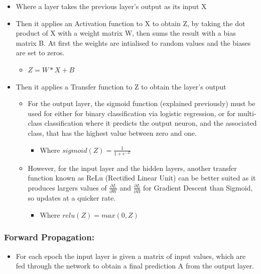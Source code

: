 \documentclass[./project-report/src/latex/project-report.tex]{subfiles}
\begin{document}
\begin{itemize}
    \item Where a layer takes the previous layer's output as its input X
    \item Then it applies an Activation function to X to obtain Z, by taking the dot product of X with a weight matrix W, then sums the result with a bias matrix B. At 
          first the weights are intialised to random values and the biases are set to zeros.
    \begin{itemize}
        \item $Z = W * X + B$
    \end{itemize}
    \item Then it applies a Transfer function to Z to obtain the layer's output
    \begin{itemize}
        \item For the output layer, the sigmoid function (explained previously) must be used for either for binary classification via logistic regression, or for multi-
              class classification where it predicts the output neuron, and the associated class, that has the highest value between zero and one.
        \begin{itemize}
            \item Where $sigmoid(Z) = \frac{1}{1+e^{-Z}}$
        \end{itemize}
        \item However, for the input layer and the hidden layers, another transfer function known as ReLu (Rectified Linear Unit) can be better suited as it produces 
              largers values of $\frac{\partial{L}}{\partial{W}}$ and $\frac{\partial{L}}{\partial{B}}$ for Gradient Descent than Sigmoid, so updates at a quicker rate.
        \begin{itemize}
            \item Where $relu(Z) = max(0, Z)$
        \end{itemize}
    \end{itemize}
\end{itemize}

\subsubsection{Forward Propagation:}

\begin{itemize}
    \item For each epoch the input layer is given a matrix of input values, which are fed through the network to obtain a final prediction A from the output layer.
\end{itemize}
\end{document}
